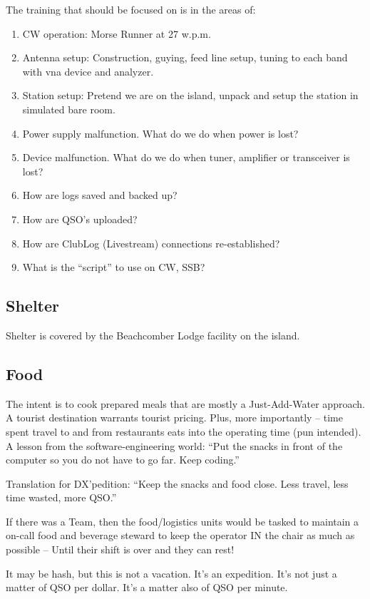 \documentclass[11pt]{article}
\begin{document}
The training that should be focused on is in the areas of:

\begin{enumerate}
\item CW operation: Morse Runner at 27 w.p.m.
\item Antenna setup: Construction, guying, feed line setup, tuning to
each band with {\gls{vna}} device and analyzer.
\item Station setup: Pretend we are on the island, unpack and setup the station
in simulated bare room.
\item Power supply malfunction.  What do we do when power is lost?
\item Device malfunction. What do we do when tuner, amplifier or transceiver
is lost?
\item How are logs saved and backed up?
\item How are QSO's uploaded?
\item How are ClubLog (Livestream) connections re-established?
\item What is the ``script'' to use on CW, SSB?
\end{enumerate}

\subsection{Shelter}

Shelter is covered by the Beachcomber Lodge facility on
the island.

\subsection{Food}

The intent is to cook prepared meals that are mostly a Just-Add-Water
approach.  A tourist destination warrants tourist pricing.  Plus,
more importantly -- time spent travel to and from restaurants
eats into the operating time (pun intended).   A lesson from
the software-engineering world:  ``Put the snacks in front
of the computer so you do not have to go far. Keep coding.''
\par
Translation for DX'pedition: ``Keep the snacks and food close. Less
travel, less time wasted, more QSO.''
\par
If there was a Team, then the food/logistics units would be
tasked to maintain a on-call food and beverage steward to keep
the operator IN the chair as much as possible -- Until their shift
is over and they can rest!
\par
It may be hash, but this is not a vacation. It's an expedition.  It's not
just a matter of QSO per dollar.  It's a matter also of QSO per minute.
\par
\end{document}
